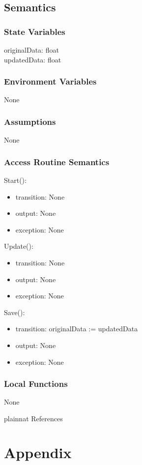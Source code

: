 \documentclass[12pt, titlepage]{article}
\begin{document}
\subsection{Semantics}

\subsubsection{State Variables}
originalData: float\\
updatedData: float
\subsubsection{Environment Variables}
None
\subsubsection{Assumptions}
None
\subsubsection{Access Routine Semantics}

\noindent Start():
\begin{itemize}
\item transition: None
\item output: None
\item exception: None
\end{itemize}

\noindent Update():
\begin{itemize}
\item transition: None
\item output: None
\item exception: None
\end{itemize}

\noindent Save():
\begin{itemize}
\item transition: originalData := updatedData
\item output: None
\item exception: None
\end{itemize}


\subsubsection{Local Functions}
None


\newpage

 {plainnat}
 {References}

\newpage

\section{Appendix} \label{Appendix}
\end{document}
